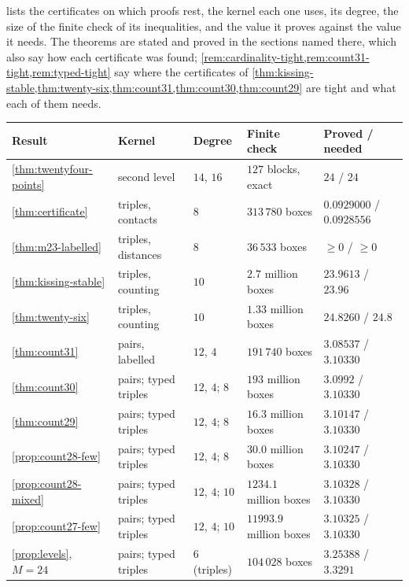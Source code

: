 \documentclass[11pt,reqno]{amsart}
\renewcommand{\_}{\origunderscore\allowbreak}
\numberwithin{equation}{section}
\theoremstyle{plain}
\theoremstyle{definition}
\theoremstyle{remark}
\begin{document}
 lists the certificates on which proofs rest, the
kernel each one uses, its degree, the size of the finite check of its
inequalities, and the value it proves against the value it needs. The
theorems are stated and proved in the sections named there, which also
say how each certificate was found;
\cref{rem:cardinality-tight,rem:count31-tight,rem:typed-tight} say where the
certificates of
\cref{thm:kissing-stable,thm:twenty-six,thm:count31,thm:count30,thm:count29}
are tight and what each of them needs.

\begin{table}[htbp]
\centering
\footnotesize
\setlength{\tabcolsep}{4pt}
\begin{tabular}{@{}lllll@{}}
\toprule
Result & Kernel & Degree & Finite check & Proved / needed\\
\midrule
\cref{thm:twentyfour-points} & second level \cite{LLM24} & $14$, $16$ & $127$ blocks, exact & $24$ / $24$\\
\cref{thm:certificate} & triples, contacts & $8$ & $313\,780$ boxes & $0.0929000$ / $0.0928556$\\
\cref{thm:m23-labelled} & triples, distances & $8$ & $36\,533$ boxes & $\ge0$ / $\ge0$\\
\cref{thm:kissing-stable} & triples, counting & $10$ & $2.7$ million boxes & $23.9613$ / $23.96$\\
\cref{thm:twenty-six} & triples, counting & $10$ & $1.33$ million boxes & $24.8260$ / $24.8$\\
\cref{thm:count31} & pairs, labelled & $12$, $4$ & $191\,740$ boxes & $3.08537$ / $3.10330$\\
\cref{thm:count30} & pairs; typed triples & $12$, $4$; $8$ & $193$ million boxes & $3.0992$ / $3.10330$\\
\cref{thm:count29} & pairs; typed triples & $12$, $4$; $8$ & $16.3$ million boxes & $3.10147$ / $3.10330$\\
\cref{prop:count28-few} & pairs; typed triples & $12$, $4$; $8$ & $30.0$ million boxes & $3.10247$ / $3.10330$\\
\cref{prop:count28-mixed} & pairs; typed triples & $12$, $4$; $10$ & $1234.1$ million boxes & $3.10328$ / $3.10330$\\
\cref{prop:count27-few} & pairs; typed triples & $12$, $4$; $10$ & $11993.9$ million boxes & $3.10325$ / $3.10330$\\
\cref{prop:levels}, $M=24$ & pairs; typed triples & $6$ (triples) & $104\,028$ boxes & $3.25388$ / $3.3291$\\

\end{tabular}
\end{table}
\end{document}
